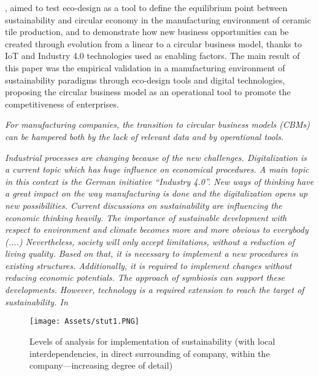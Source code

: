 \textbf{}\par
\textcite{Garcia-Muina2019}, aimed to test eco-design as a tool to define the equilibrium point between sustainability and circular economy in the manufacturing environment of ceramic tile production, and to demonstrate how new business opportunities can be created through evolution from a linear to a circular business model, thanks to IoT and Industry 4.0 technologies used as enabling factors. The main result of this paper was the empirical validation in a manufacturing environment of sustainability paradigms through eco-design tools and digital technologies, proposing the circular business model as an operational tool to promote the competitiveness of enterprises. \par
\textit{For manufacturing companies, the transition to circular business models (CBMs) can be hampered both by the lack of relevant data and by operational tools.}

\textbf{}\par
\textcite{Hertwig2019}
\textit{Industrial processes are changing because of the new challenges. Digitalization is a current topic which has huge influence on economical procedures. A main topic in this context is the German initiative “Industry 4.0”. New ways of thinking have a great impact on the way manufacturing is done and the digitalization opens up new possibilities. Current discussions on sustainability are influencing the economic thinking heavily. The importance of sustainable development with respect to environment and climate becomes more and more obvious to everybody (....) Nevertheless, society will only accept limitations, without a reduction of living quality. Based on that, it is necessary to implement a new procedures in existing structures. Additionally, it is required to implement changes without reducing economic potentials. The approach of symbiosis can support these developments. However, technology is a required extension to reach the target of sustainability. In}


\begin{figure}[h!]
    \centering
    \texttt{[image: Assets/stut1.PNG]}
    \caption{Levels of analysis for implementation of sustainability (with local interdependencies, in direct surrounding of company, within the company—increasing degree of detail)}
    \label{fig:indusrty_town}
\end{figure}


\textbf{}\par
\textcite{Ares2019}

